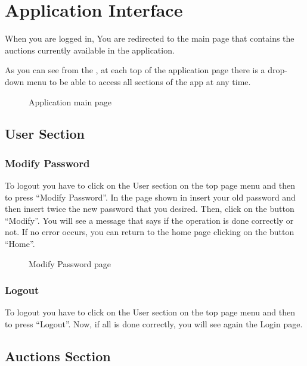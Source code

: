 \section{Application Interface}

When you are logged in, You are redirected to the main page that contains the
auctions currently available in the application.

As you can see from the , at each top of the
application page there is a drop-down menu to be able to access all sections of
the app at any time.

\begin{figure}[htb]
	\centering
	\caption{Application main page}\label{fig:main-page}
\end{figure}

\subsection{User Section}

\subsubsection{Modify Password}

To logout you have to click on the User section on the top page menu and then to
press ``Modify Password''. In the page shown in  insert your
old password and then insert twice the new password that you desired. Then,
click on the button ``Modify''. You will see a message that says if the
operation is done correctly or not. If no error occurs, you can return to the
home page clicking on the button ``Home''.

\begin{figure}[htb]
	\centering
	\caption{Modify Password page}\label{fig:modify}
\end{figure}

\subsubsection{Logout}
To logout you have to click on the User section on the top page menu and then to
press ``Logout''. Now, if all is done correctly, you will see again the Login
page.

\subsection{Auctions Section}


